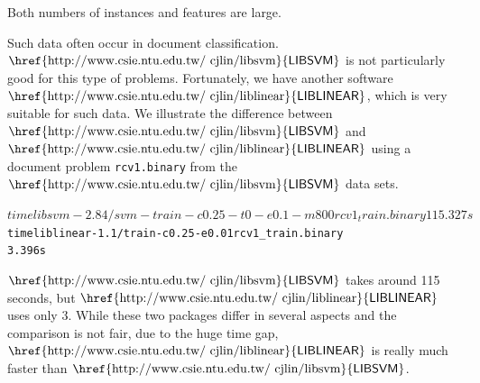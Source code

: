 \documentclass[12pt]{article}
\newcommand{\libsvm}{$\mbox{\href{http://www.csie.ntu.edu.tw/~cjlin/libsvm}{\sf LIBSVM}}$\xspace}
\newcommand{\liblinear}{$\mbox{\href{http://www.csie.ntu.edu.tw/~cjlin/liblinear}{\sf LIBLINEAR}}$\xspace}
\begin{document}
\medskip

 Both numbers of instances and features are
  large.

  Such data often occur in document classification. \libsvm is not
particularly good for this type of problems. Fortunately, we have another
  software \liblinear, which is very suitable for such data. We
  illustrate the difference between \libsvm and \liblinear using a
  document problem
{\tt rcv1.binary} from the \libsvm data sets.
\begin{alltt}$time libsvm-2.84/svm-train -c 0.25 -t 0 -e 0.1 -m 800 rcv1_train.binary
115.327s
$ time liblinear-1.1/train -c 0.25 -e 0.01 rcv1_train.binary
3.396s\end{alltt}
\libsvm takes around 115 seconds, but
\liblinear uses only 3.
While these two packages differ
in several aspects and the comparison
is not fair,
due to the huge time gap,
\liblinear is really much faster
than \libsvm.



\end{document}
